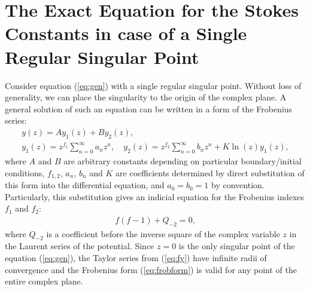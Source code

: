 \documentclass{ws-m3as}
\newcommand\eref[1]{(\ref{#1})}
\begin{document}
\section{The Exact Equation for the Stokes Constants in case of a Single Regular Singular Point \label{sec:frob}}
Consider equation \eref{eq:gen} with a single regular singular point. Without loss of generality,
we can place the singularity to the origin of the complex plane. A general solution of such an equation 
can be written in a form of the Frobenius series\cite{cbbook}:
\begin{subequations}
\label{eq:frobform}
\begin{eqnarray}
y(z) = A y_1(z)+B y_2(z), \label{eq:fgensol}
\\
y_1(z) = z^{f_1}\sum_{n=0}^{\infty}{a_n z^n},
\quad
y_2(z) = z^{f_2}\sum_{n=0}^{\infty}{b_n z^n} + K \ln(z) y_1(z), \label{eq:fy}
\end{eqnarray}
\end{subequations}
where $A$ and $B$ are arbitrary constants depending on particular boundary/initial conditions,  
$f_{1,2}$, $a_n$, $b_n$ and $K$ are coefficients determined by direct substitution of this form into the 
differential equation, and $a_0=b_0=1$ by convention. Particularly, this substitution gives
an indicial equation for the Frobenius indexes $f_1$ and $f_2$:
\begin{eqnarray}
f(f-1)+Q_{-2}=0,   \label{eq:indicial}
\end{eqnarray}
where $Q_{-2}$ is a coefficient before the inverse square of the complex variable $z$ in the Laurent series
of the potential. Since $z=0$ is the only singular point of the equation \eref{eq:gen}, the Taylor 
series from \eref{eq:fy} have infinite radii of convergence and the
Frobenius form \eref{eq:frobform} is valid for any point of the entire complex plane.
\end{document}

